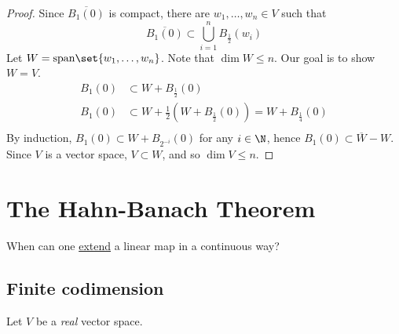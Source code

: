 \documentclass{article}
\newcommand{\K}{\mathbb{K}}
\begin{document}
\begin{proof}
    Since $\overline{B_1(0)}$ is compact, there are $w_1, \dotsc, w_n \in V$ such that
    \begin{equation*}
        \overline{B_1(0)} \subset \bigcup_{i=1}^n B_{\frac12} (w_i)
    \end{equation*}
    Let $W = \mathrm{span}\set{w_1, \dotsc, w_n}$. Note that $\dim W \leq n$. Our goal is to show $W = V$.
    \begin{align*}
        B_1(0) &\subset W + B_{\frac{1}{2}} (0) \\
        B_1(0) &\subset W + \frac{1}{2}\left(W + B_{\frac{1}{2}} (0)\right) = W + B_{\frac{1}{4}}(0) \\
    \end{align*}
    By induction, $B_1(0) \subset W + B_{2^{-i}}(0)$ for any $i \in \N$, hence $B_1(0) \subset \overline{W} - W$. Since $V$ is a vector space, $V \subset W$, and so $\dim V \leq n$.
\end{proof}

\clearpage


\section{The Hahn-Banach Theorem}


When can one \hyperlink{def:extend}{extend} a linear map in a continuous way?

\subsection{Finite codimension}

Let $V$ be a \emph{real} vector space.

\end{document}
